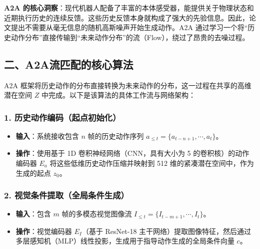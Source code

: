 \textbf{A2A 的核心洞察}：现代机器人配备了丰富的本体感受器，能提供关于物理状态和近期执行历史的连续反馈。这些历史反馈本身就构成了强大的先验信息。因此，论文提出不需要从毫无信息的随机高斯噪声开始生成动作。A2A 通过学习一个将``历史动作分布''直接传输到``未来动作分布''的流（Flow），绕过了昂贵的去噪过程。

\hypertarget{ux4e8ca2aux6d41ux5339ux914dux7684ux6838ux5fc3ux7b97ux6cd5}{%
\subsection{二、A2A流匹配的核心算法}\label{ux4e8ca2aux6d41ux5339ux914dux7684ux6838ux5fc3ux7b97ux6cd5}}

A2A 框架将历史动作的分布直接转换为未来动作的分布，这一过程在共享的高维潜在空间 \(Z\) 中完成。以下是该算法的具体工作流与网络架构：

\hypertarget{ux5386ux53f2ux52a8ux4f5cux7f16ux7801ux8d77ux70b9ux521dux59cbux5316}{%
\subsubsection{1. 历史动作编码（起点初始化）}\label{ux5386ux53f2ux52a8ux4f5cux7f16ux7801ux8d77ux70b9ux521dux59cbux5316}}

\begin{itemize}
\tightlist
\item
  \textbf{输入}：系统接收包含 \(n\) 帧的历史动作序列 \(a_{\le t}=\{a_{t-n+1},\cdots,a_t\}\)。
\item
  \textbf{操作}：使用基于 1D 卷积神经网络（CNN，具有大小为 5 的卷积核）的动作编码器 \(E_a\) 将这些低维历史动作压缩并映射到 512 维的紧凑潜在空间中，作为生成的起点 \(z_0\)。
\end{itemize}

\hypertarget{ux89c6ux89c9ux6761ux4ef6ux63d0ux53d6ux5168ux5c40ux6761ux4ef6ux751fux6210}{%
\subsubsection{2. 视觉条件提取（全局条件生成）}\label{ux89c6ux89c9ux6761ux4ef6ux63d0ux53d6ux5168ux5c40ux6761ux4ef6ux751fux6210}}

\begin{itemize}
\tightlist
\item
  \textbf{输入}：包含 \(m\) 帧的多模态视觉图像流 \(I_{\le t}=\{I_{t-m+1},\cdots,I_t\}\)。
\item
  \textbf{操作}：视觉编码器 \(E_I\)（基于 ResNet-18 主干网络）提取图像特征，然后通过多层感知机（MLP）线性投影，生成用于指导动作生成的全局条件向量 \(c\)。
\end{itemize}

